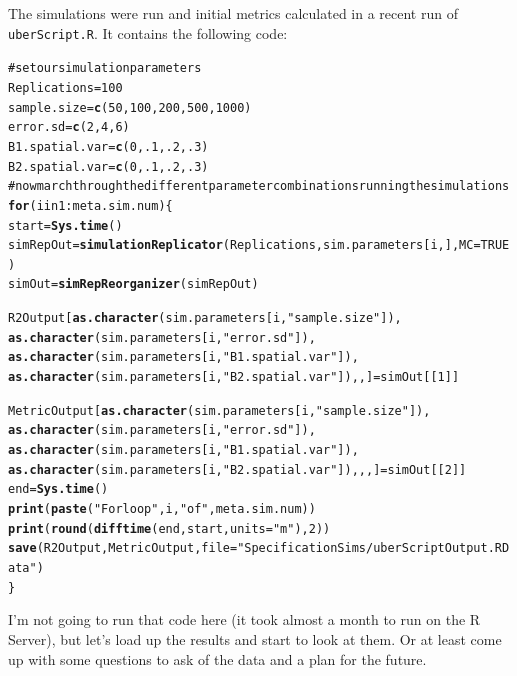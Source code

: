 \documentclass{article}\usepackage{graphicx, color}
\makeatletter
\newcommand{\hlfunctioncall}[1]{\textcolor[rgb]{0.501960784313725,0,0.329411764705882}{\textbf{#1}}}%
\newcommand{\hlstring}[1]{\textcolor[rgb]{0.6,0.6,1}{#1}}%
\newcommand{\hlcomment}[1]{\textcolor[rgb]{0.180392156862745,0.6,0.341176470588235}{#1}}%
\newenvironment{kframe}{%
 \def\at@end@of@kframe{}%
 \ifinner\ifhmode%
  \def\at@end@of@kframe{\end{minipage}}%
  \begin{minipage}{\columnwidth}%
 \fi\fi%
 \def\FrameCommand##1{\hskip\@totalleftmargin \hskip-\fboxsep
 \colorbox{shadecolor}{##1}\hskip-\fboxsep
     \hskip-\linewidth \hskip-\@totalleftmargin \hskip\columnwidth}%
 \MakeFramed {\advance\hsize-\width
   \@totalleftmargin\z@ \linewidth\hsize
   \@setminipage}}%
 {\par\unskip\endMakeFramed%
 \at@end@of@kframe}
\newenvironment{knitrout}{}{} %
\makeatother
\begin{document}
The simulations were run and initial metrics calculated in a recent run of \texttt{uberScript.R}. It contains the following code:

\begin{knitrout}
\color{fgcolor}\begin{kframe}
\begin{alltt}
\hlcomment{# set our simulation parameters}
Replications = 100
sample.size = \hlfunctioncall{c}(50, 100, 200, 500, 1000)
error.sd = \hlfunctioncall{c}(2, 4, 6)
B1.spatial.var = \hlfunctioncall{c}(0, .1, .2, .3)
B2.spatial.var = \hlfunctioncall{c}(0, .1, .2, .3)
\hlcomment{# now march through the different parameter combinations running the simulations}
\hlfunctioncall{for}( i in 1:meta.sim.num) \{ 
  start = \hlfunctioncall{Sys.time}()
  simRepOut = \hlfunctioncall{simulationReplicator}(Replications, sim.parameters[i, ], MC = TRUE)
  simOut = \hlfunctioncall{simRepReorganizer}(simRepOut)
  
  R2Output[\hlfunctioncall{as.character}(sim.parameters[i, \hlstring{"sample.size"}]),
           \hlfunctioncall{as.character}(sim.parameters[i, \hlstring{"error.sd"}]),
           \hlfunctioncall{as.character}(sim.parameters[i, \hlstring{"B1.spatial.var"}]),
           \hlfunctioncall{as.character}(sim.parameters[i, \hlstring{"B2.spatial.var"}]), , ] = simOut[[1]]
  
  MetricOutput[\hlfunctioncall{as.character}(sim.parameters[i, \hlstring{"sample.size"}]),
               \hlfunctioncall{as.character}(sim.parameters[i, \hlstring{"error.sd"}]),
               \hlfunctioncall{as.character}(sim.parameters[i, \hlstring{"B1.spatial.var"}]),
               \hlfunctioncall{as.character}(sim.parameters[i, \hlstring{"B2.spatial.var"}]), , , ] = simOut[[2]]
  end = \hlfunctioncall{Sys.time}()
  \hlfunctioncall{print}(\hlfunctioncall{paste}(\hlstring{"For loop"}, i,\hlstring{"of"}, meta.sim.num))
  \hlfunctioncall{print}(\hlfunctioncall{round}(\hlfunctioncall{difftime}(end, start, units = \hlstring{"m"}), 2))
  \hlfunctioncall{save}(R2Output, MetricOutput, file = \hlstring{"SpecificationSims/uberScriptOutput.RData"})
\}
\end{alltt}
\end{kframe}
\end{knitrout}


I'm not going to run that code here (it took almost a month to run on the R Server), but let's load up the results and start to look at them. Or at least come up with some questions to ask of the data and a plan for the future.
\end{document}
